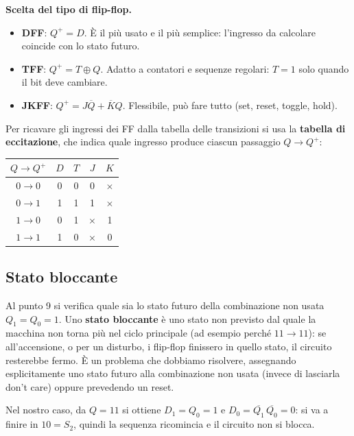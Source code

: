 \begin{important}
\textbf{Scelta del tipo di flip-flop.}
\begin{itemize}[leftmargin=1.3em, itemsep=2pt]
    \item \textbf{DFF}: $Q^+ = D$. È il più usato e il più semplice: l'ingresso da
          calcolare coincide con lo stato futuro.
    \item \textbf{TFF}: $Q^+ = T\oplus Q$. Adatto a contatori e sequenze regolari: $T=1$ solo
          quando il bit deve cambiare.
    \item \textbf{JKFF}: $Q^+ = J\overline{Q}+\overline{K}Q$. Flessibile, può fare tutto
          (set, reset, toggle, hold).
\end{itemize}
Per ricavare gli ingressi dei FF dalla tabella delle transizioni si usa la
\textbf{tabella di eccitazione}, che indica quale ingresso produce ciascun passaggio
$Q \to Q^+$:
\begin{center}
\begin{tabular}{c|c|c|cc}
\toprule
$Q \to Q^+$ & $D$ & $T$ & $J$ & $K$ \\
\midrule
$0 \to 0$ & 0 & 0 & 0 & $\times$ \\
$0 \to 1$ & 1 & 1 & 1 & $\times$ \\
$1 \to 0$ & 0 & 1 & $\times$ & 1 \\
$1 \to 1$ & 1 & 0 & $\times$ & 0 \\
\bottomrule
\end{tabular}
\end{center}
\end{important}

\subsection{Stato bloccante}

Al punto 9 si verifica quale sia lo stato futuro della combinazione non usata
$Q_1=Q_0=1$. Uno \textbf{stato bloccante} è uno stato non previsto dal quale la macchina non
torna più nel ciclo principale (ad esempio perché $11 \to 11$): se all'accensione, o per un
disturbo, i flip-flop finissero in quello stato, il circuito resterebbe fermo. È un problema
che dobbiamo risolvere, assegnando esplicitamente uno stato futuro alla combinazione non
usata (invece di lasciarla don't care) oppure prevedendo un reset.

\noindent Nel nostro caso, da $Q=11$ si ottiene $D_1=Q_0=1$ e
$D_0=\overline{Q_1}\,\overline{Q_0}=0$: si va a finire in $10=S_2$, quindi la sequenza
ricomincia e il circuito non si blocca.

